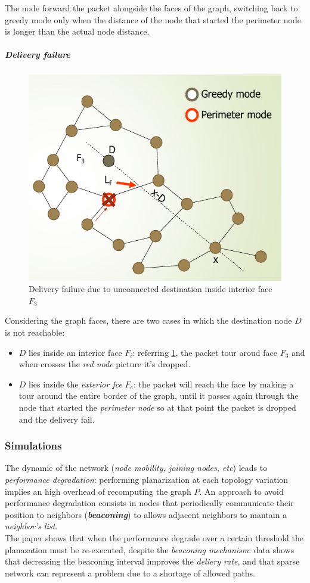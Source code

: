 \documentclass[10pt,a4paper]{report}
\theoremstyle{definition}
\begin{document}
The node forward the packet alongside the faces of the graph, switching back to greedy mode only when the distance of the node that started the perimeter node is longer than the actual node distance.
\subparagraph{Delivery failure}\label{sec:delivery-failure}
\begin{figure}[h!]
	\centering\includegraphics[scale=0.50]{images/Pasted image 20230523163539.png}
	\caption{Delivery failure due to unconnected destination inside interior face $F_{3}$}
	\label{delivery-failure}
\end{figure}
Considering the graph faces, there are two cases in which the destination node $D$ is not reachable:
\begin{itemize}
	\item 
	$D$ lies inside an interior face $F_{i}$: referring \ref{delivery-failure}, the packet tour aroud face $F_{3}$ and when crosses the \textit{red node} picture it's dropped.
	\item 
	$D$ lies inside the \textit{exterior fce} $F_{e}$: the packet will reach the face by making a tour around the entire border of the graph, until it passes again through the node that started the \textit{perimeter node} so at that point the packet is dropped and the delivery fail.
\end{itemize}
\subsubsection{Simulations}\label{sec:simulations}
The dynamic of the network (\textit{node mobility, joining nodes, etc}) leads to \textit{performance degradation}: performing planarization at each topology variation implies an high overhead of recomputing the graph $P$.
An approach to avoid performance degradation consists in nodes that periodically communicate their position to neighbors (\textit{\textbf{beaconing}}) to allows adjacent neighbors to mantain a \textit{neighbor's list}.\\
The paper shows that when the performance degrade over a certain threshold the planazation must be re-executed, despite the \textit{beaconing mechanism}: data shows that decreasing the beaconing interval improves the \textit{deliery rate}, and that sparse network can represent a problem due to a shortage of allowed paths.
\end{document}
